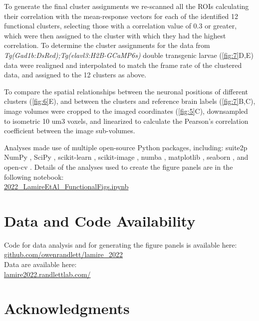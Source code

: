 \documentclass[9pt,lineno]{RandlettLab_elife}
\begin{document}
To generate the final cluster assignments we re-scanned all the ROIs calculating their correlation with the mean-response vectors for each of the identified 12 functional clusters, selecting those with a correlation value of 0.3 or greater, which were then assigned to the cluster with which they had the highest correlation. To determine the cluster assignments for the data from \emph{Tg(Gad1b:DsRed);Tg(elavl3:H2B-GCaMP6s)} double transgenic larvae (\autoref{fig:7}D,E) data were realigned and interpolated to match the frame rate of the clustered data, and assigned to the 12 clusters as above. 

To compare the spatial relationships between the neuronal positions of different clusters (\autoref{fig:6}E), and between the clusters and reference brain labels (\autoref{fig:7}B,C), image volumes were cropped to the imaged coordinates (\autoref{fig:5}C), downsampled to isometric 10 um3 voxels, and linearized to calculate the Pearson's correlation coefficient between the image sub-volumes. 

Analyses made use of multiple open-source Python packages, including:
suite2p \cite{Pachitariu2017-ad}
NumPy \cite{Harris2020-bg}, SciPy \cite{Virtanen2020-sz}, scikit-learn \cite{Pedregosa2011-dj}, scikit-image \cite{Van_der_Walt2014-hx}, numba \cite{Lam2015-pq}, matplotlib \cite{Hunter2007-ub}, seaborn \cite{Waskom2021-ah}, and open-cv \cite{Bradski2000-qo}.
 Details of the analyses used to create the figure panels are in the following notebook: 
 \\ \href{https://nbviewer.org/github/owenrandlett/lamire_2022/blob/main/2022_LamireEtAl_FunctionalFigs.ipynb}{2022\_LamireEtAl\_FunctionalFigs.ipynb}

\section{Data and Code Availability}

Code for data analysis and for generating the figure panels is available here: \\
\href{https://github.com/owenrandlett/lamire_2022}{github.com/owenrandlett/lamire\_2022} \\
Data are available here: \\
\href{http://lamire2022.randlettlab.com/}{lamire2022.randlettlab.com/} 

\section{Acknowledgments}
\end{document}
